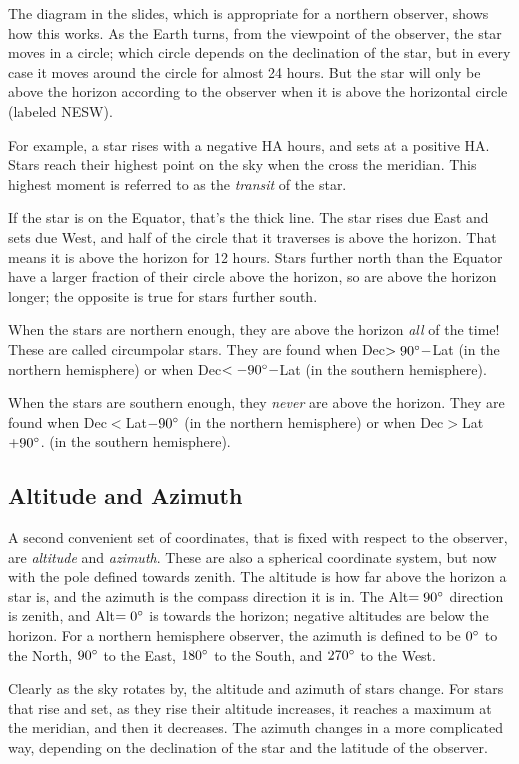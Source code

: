 \documentclass[12pt, preprint]{aastex}
\begin{document}
The diagram in the slides, which is appropriate for a northern
observer, shows how this works. As the Earth turns, from the viewpoint
of the observer, the star moves in a circle; which circle depends on
the declination of the star, but in every case it moves around the
circle for almost 24 hours. But the star will only be above the
horizon according to the observer when it is above the horizontal
circle (labeled NESW).

For example, a star rises with a negative HA hours, and sets at a
positive HA. Stars reach their highest point on the sky when the cross
the meridian. This highest moment is referred to as the {\it transit}
of the star.

If the star is on the Equator, that's the thick line.  The star rises
due East and sets due West, and half of the circle that it traverses
is above the horizon. That means it is above the horizon for 12
hours. Stars further north than the Equator have a larger fraction of
their circle above the horizon, so are above the horizon longer; the
opposite is true for stars further south.

When the stars are northern enough, they are above the horizon {\it
  all} of the time! These are called circumpolar stars. They are found
when Dec$>90{}^\circ -$Lat (in the northern hemisphere) or when
Dec$<-90{}^\circ -$Lat (in the southern hemisphere).

When the stars are southern enough, they {\it never} are above the
horizon.  They are found when Dec$<$Lat$-90{}^\circ$ (in the northern
hemisphere) or when Dec$>$Lat$+90{}^\circ$. (in the southern
hemisphere).

\subsection{Altitude and Azimuth}

A second convenient set of coordinates, that is fixed with respect to
the observer, are {\it altitude} and {\it azimuth}. These are also a
spherical coordinate system, but now with the pole defined towards
zenith.  The altitude is how far above the horizon a star is, and the
azimuth is the compass direction it is in.  The Alt$=90{}^\circ$
direction is zenith, and Alt$=0{}^\circ$ is towards the horizon;
negative altitudes are below the horizon. For a northern hemisphere
observer, the azimuth is defined to be $0{}^\circ$ to the North,
$90{}^\circ$ to the East, $180{}^\circ$ to the South, and $270{}^\circ$ to
the West.

Clearly as the sky rotates by, the altitude and azimuth of stars
change. For stars that rise and set, as they rise their altitude
increases, it reaches a maximum at the meridian, and then it
decreases. The azimuth changes in a more complicated way, depending on
the declination of the star and the latitude of the observer.
\end{document}
